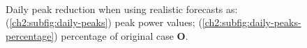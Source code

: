\begin{figure}\centering
	\\
	\caption{Daily peak reduction when using realistic forecasts as: (\ref{ch2:subfig:daily-peaks}) peak power values; (\ref{ch2:subfig:daily-peaks-percentage}) percentage of original case \textbf{O}.}
	\label{ch2:fig:daily-peaks}
\end{figure}